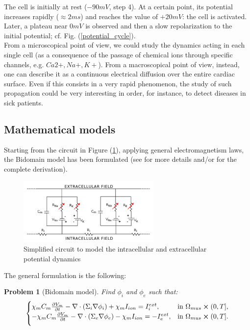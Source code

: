 \documentclass[a4paper,11pt]{article}
\newtheorem{problem}{Problem}
\begin{document}
    \noindent The cell is initially at rest ($-90mV$, step 4). At a certain point, its potential increases rapidly ($\approx2ms$) and reaches the value of $+20mV$: the cell is activated. Later, a plateau near $0mV$ is observed and then a slow repolarization to the initial potential; cf. Fig. (\ref{potential_cycle}). \\
    From a microscopical point of view, we could study the dynamics acting in each single cell (as a consequence of the passage of chemical ions through specific channels, e.g. $Ca2+,Na+,K+$). From a macroscopical point of view, instead, one can describe it as a continuous electrical diffusion over the entire cardiac surface. Even if this consists in a very rapid phenomenon, the study of such propagation could be very interesting in order, for instance, to detect diseases in sick patients.
    
    \subsection{Mathematical models}
    Starting from the circuit in Figure (\ref{electrical_circuit}), applying general electromagnetism laws, the Bidomain model has been formulated (see \parencite{acta} for more details and/or \parencite{colli_franzone} for the complete derivation).
    
    \begin{figure}[h]
    	\begin{center}
    		\includegraphics[width = 7cm]{./electrical_circuit.png}
    		\caption{Simplified circuit to model the intracellular and extracellular potential dynamics}
    		\label{electrical_circuit}
    	\end{center}
    \end{figure}
    
    \noindent The general formulation is the following: \vspace{3mm}
    \begin{problem}[Bidomain model]
    Find $\phi_i$ and $\phi_e$ such that:
	\begin{equation*}
	\begin{cases}
	\chi_m C_m\pdv{V_m}{t} - \nabla \cdot (\Sigma_i \nabla \phi_i) + \chi_m I_{ion} = I_i^{ext},    & \text{in } \Omega_{mus} \cross (0,T],
	\\
	\vspace{2mm}
	-\chi_m C_m\pdv{V_m}{t} - \nabla \cdot (\Sigma_e \nabla \phi_e) - \chi_m I_{ion} = -I_e^{ext},    & \text{in } \Omega_{mus} \cross (0,T].
	\end{cases}
	\end{equation*}
	\end{problem}
	\vspace{3mm}
	
\end{document}
